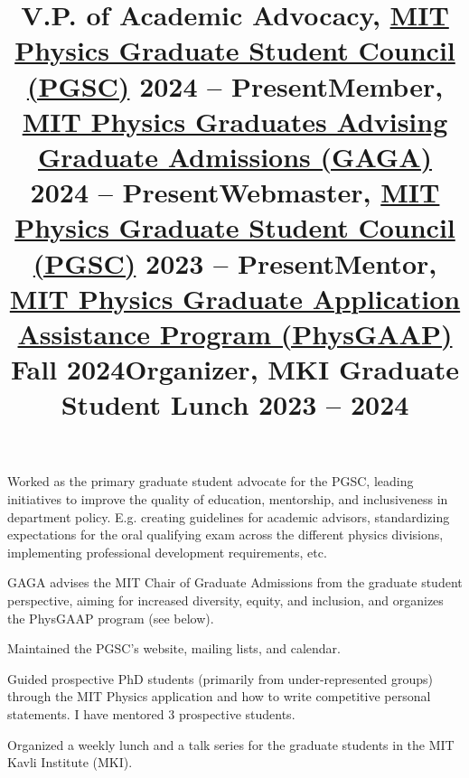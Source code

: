 \documentclass[marg, centered]{res}
\begin{document}
\begin{resume}
\title{\textbf{V.P. of Academic Advocacy}, \href{https://physics-gsc.scripts.mit.edu/home/}{\color{dkbu} MIT Physics Graduate Student Council (PGSC)} \hfill \textbf{2024 -- Present}}
\begin{position}
{\small Worked as the primary graduate student advocate for the PGSC, leading initiatives to improve the quality of education, mentorship, and inclusiveness in department policy.  E.g. creating guidelines for academic advisors, standardizing expectations for the oral qualifying exam across the different physics divisions, implementing professional development requirements, etc.}
\end{position}

\vspace{-0.2cm}
\title{\textbf{Member}, \href{https://physics-gsc.scripts.mit.edu/home/gaga/}{\color{dkbu} MIT Physics Graduates Advising Graduate Admissions (GAGA)} \hfill \textbf{2024 -- Present}}
\begin{position}
{\small GAGA advises the MIT Chair of Graduate Admissions from the graduate student perspective, aiming for increased diversity, equity, and inclusion, and organizes the PhysGAAP program (see below).}
\end{position}

\vspace{-0.2cm}
\title{\textbf{Webmaster}, \href{https://physics-gsc.scripts.mit.edu/home/}{\color{dkbu} MIT Physics Graduate Student Council (PGSC)} \hfill \textbf{2023 -- Present}}
\begin{position}
{\small Maintained the PGSC's website, mailing lists, and calendar.}
\end{position}

\vspace{-0.2cm}
\title{\textbf{Mentor}, \href{https://sites.mit.edu/physgaap/}{\color{dkbu} MIT Physics Graduate Application Assistance Program (PhysGAAP)} \hfill \textbf{Fall 2024}}
\begin{position}
{\small Guided prospective PhD students (primarily from under-represented groups) through the MIT Physics application and how to write competitive personal statements.  I have mentored 3 prospective students.}
\end{position}

\vspace{-0.2cm}
\title{\textbf{Organizer}, MKI Graduate Student Lunch \hfill \textbf{2023 -- 2024}}
\begin{position}
{\small Organized a weekly lunch and a talk series for the graduate students in the MIT Kavli Institute (MKI).}
\end{position}


\end{resume}
\end{document}
